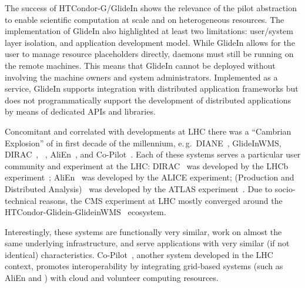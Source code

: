 \documentclass{sig-alternate}
\begin{document}

The success of HTCondor-G/GlideIn shows the relevance of the pilot abstraction
to enable scientific computation at scale and on heterogeneous resources. The
implementation of GlideIn also highlighted at least two limitations: user/system
layer isolation, and application development model. While GlideIn allows for the
user to manage resource placeholders directly, daemons must still be running on
the remote machines. This means that GlideIn cannot be deployed without
involving the machine owners and system administrators. Implemented as a
service, GlideIn supports integration with distributed application frameworks
but does not programmatically support the development of distributed
applications by means of dedicated APIs and libraries.

Concomitant and correlated with developments at LHC there was a ``Cambrian
Explosion'' of \pilotjobs in first decade of the millennium, e.\,g.\
DIANE~\cite{moscicki2003diane}, GlideInWMS, DIRAC~\cite{casajus2010dirac},
\panda~\cite{zhao2011panda}, AliEn~\cite{saiz2003alien}, and
Co-Pilot~\cite{buncicco2011co}.  Each of these \pilotjob systems serves a
particular user community and experiment at the LHC:
DIRAC~\cite{casajus2010dirac} was developed by the LHCb
experiment~\cite{lhcb_url}; AliEn~\cite{saiz2003alien} was developed by the
ALICE experiment; \panda (Production and Distributed
Analysis)~\cite{zhao2011panda} was developed by the ATLAS
experiment~\cite{aad2008atlas}. Due to socio-technical reasons, the CMS
experiment at LHC mostly converged around the
HTCondor-Glidein-GlideinWMS~\cite{sfiligoi2008glideinwms} ecosystem.

Interestingly, these systems are functionally very similar, work on almost the
same underlying infrastructure, and serve applications with very similar (if not
identical) characteristics.
Co-Pilot~\cite{buncicco2011co,harutyunyan2012cernvm}, another \pilotjob system
developed in the LHC context, promotes interoperability by integrating
grid-based \pilotjob systems (such as AliEn and \panda) with cloud and volunteer
computing resources.

\end{document}
